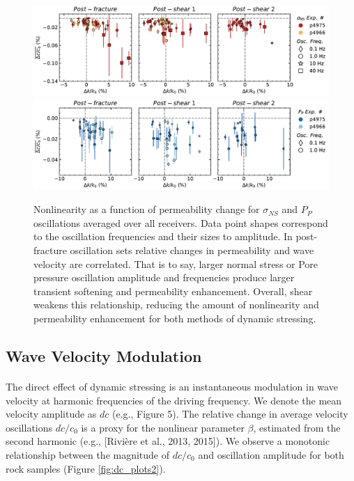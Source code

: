 \documentclass[letterpaper,10pt]{article}
\begin{document}
\begin{figure}[ht]
	\centering
	\includegraphics[width=1\columnwidth]{avgDelc_All_ampsNS}
	\includegraphics[width=1\columnwidth]{avgDelc_All_ampsPP}
	\caption{Nonlinearity as a function of permeability change for $ \sigma_{NS} $ and $ P_P $ oscillations averaged over all receivers. Data point shapes correspond to the oscillation frequencies and their sizes to amplitude. In post-fracture oscillation sets relative changes in permeability and wave velocity are correlated. That is to say, larger normal stress or Pore pressure oscillation amplitude and frequencies produce larger transient softening and permeability enhancement. Overall, shear weakens this relationship, reducing the amount of nonlinearity and permeability enhancement for both methods of dynamic stressing. }
	\label{fig:delc_plots2}
\end{figure}

\clearpage

\subsection{Wave Velocity Modulation}
\paragraph{}
The direct effect of dynamic stressing is an instantaneous modulation in wave velocity at harmonic frequencies of the driving frequency. We denote the mean velocity amplitude as $ dc $ (e.g., Figure 5). The relative change in average velocity oscillations $ dc/c_0 $ is a proxy for the nonlinear parameter $ \beta $, estimated from the second harmonic (e.g., [Rivière et al., 2013, 2015]). We observe a monotonic relationship between the magnitude of $ dc/c_0 $ and oscillation amplitude for both rock samples (Figure \ref{fig:dc_plots2}).
\end{document}
